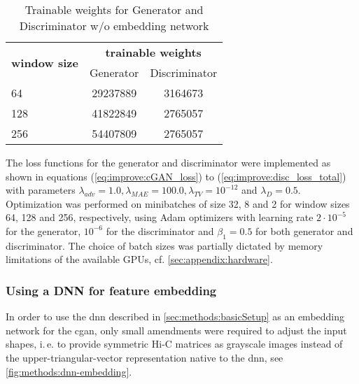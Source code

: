 \begin{table}[htbp]
\centering
\begin{tabular}{lcc}
\hline
\multirow{2}{*}{\textbf{window size}} & \multicolumn{2}{c}{\textbf{trainable weights}} \\
                                     & \multicolumn{1}{c}{Generator}            & \multicolumn{1}{c}{Discriminator}           \\ \hline
64                                   & \SI{29237889}{}             & \SI{3164673}{}                 \\
128                                  & \SI{41822849}{}             & \SI{2765057}{}                 \\
256                                  & \SI{54407809}{}             & \SI{2765057}{}              \\ \hline
\end{tabular}
\caption{Trainable weights for Generator and Discriminator w/o embedding network}
\label{tab:methods:gen_disc_params}
\end{table}

The loss functions for the generator and discriminator were implemented as shown in equations (\ref{eq:improve:cGAN_loss}) to (\ref{eq:improve:disc_loss_total})
with parameters $\lambda_\mathit{adv}=1.0, \lambda_\mathit{MAE}=100.0, \lambda_\mathit{TV}=10^{-12}$ and $\lambda_D=0.5$.
Optimization was performed on minibatches of size 32, 8 and 2 for window sizes 64, 128 and 256, respectively, 
using Adam optimizers with learning rate $2\cdot10^{-5}$ for the generator, $10^{-6}$ for the discriminator and $\beta_1=0.5$ for both generator and discriminator.
The choice of batch sizes was partially dictated by memory limitations of the available GPUs, cf. \cref{sec:appendix:hardware}.

\subsubsection{Using a DNN for feature embedding} \label{sec:methods:dnn-embedding}
In order to use the \acrshort{dnn} described in \cref{sec:methods:basicSetup} as an embedding network
for the \acrshort{cgan}, only small amendments were required to adjust the input shapes,
i.\,e. to provide symmetric Hi-C matrices as grayscale images instead of the upper-triangular-vector representation
native to the \acrshort{dnn}, see \cref{fig:methods:dnn-embedding}.

